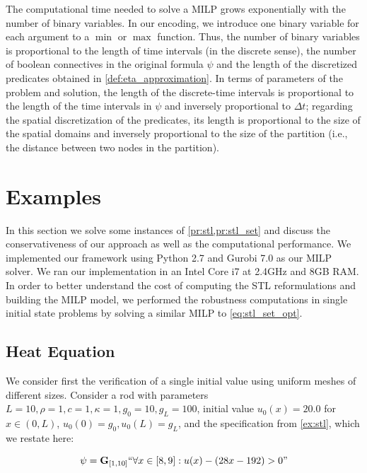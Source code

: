 \documentclass[oribibl]{llncs/llncs}
\newcommand{\Always}{\mathbf{G}}
\begin{document}
The computational time needed to solve a MILP grows exponentially with 
the number of binary variables. In our encoding, we introduce one
binary variable for each argument to a $\min$ or $\max$ function. Thus, the
number of binary variables is proportional to the length of time intervals (in
the discrete sense), the number of boolean connectives in the original formula
$\psi$ and the length of the discretized predicates obtained in
\cref{def:eta_approximation}. In terms of parameters of the problem and solution,
the length of the discrete-time intervals is proportional to the length of the time
intervals in $\psi$ and inversely proportional to $\Delta t$; regarding the
spatial discretization of the predicates, its length is proportional to the size
of the spatial domains and inversely proportional to the size of the partition
(i.e., the distance between two nodes in the partition).

\section{Examples}
\label{sec:examples}

In this section we solve some instances of \cref{pr:stl,pr:stl_set} and discuss
the conservativeness of our approach as well as the computational performance.
We implemented our framework using Python 2.7 and Gurobi 7.0 as our MILP solver.
We ran our implementation in an Intel Core i7 at 2.4GHz and 8GB RAM. In order to
better understand the cost of computing the STL reformulations and building the
MILP model, we performed the robustness computations in single initial state
problems by solving a similar MILP to \cref{eq:stl_set_opt}.

\subsection{Heat Equation}
\label{sub:heat_equation}

We consider first the verification of a single initial value using uniform
meshes of different sizes. Consider a rod with parameters $L = 10, \rho = 1, c =
1, \kappa = 1, g_0 = 10, g_L = 100$, initial value $u_0(x) = 20.0$
for $x \in (0, L)$, $u_0(0) = g_0, u_0(L) = g_L$, and the specification from
\cref{ex:stl}, which we restate here:

\begin{equation}
    \psi = \Always_{[1,10]} ``\forall x \in [8,9] : u(x) - (28x - 192) > 0"
\end{equation}
\end{document}
